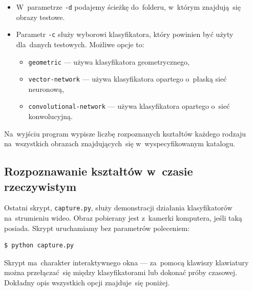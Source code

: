 \documentclass[11pt,a4paper]{article}
\begin{document}
\begin{itemize}
    \item W~parametrze \verb+-d+ podajemy ścieżkę do~folderu, w~którym znajdują~się obrazy testowe.
    \item Parametr \verb+-c+ służy wyborowi klasyfikatora, który powinien być użyty dla~danych testowych.
    Możliwe opcje to:
    \begin{itemize}
        \item \verb+geometric+ --- używa klasyfikatora geometrycznego,
        \item \verb+vector-network+ --- używa klasyfikatora opartego o~płaską sieć neuronową,
        \item \verb+convolutional-network+ --- używa klasyfikatora opartego o~sieć konwolucyjną.
    \end{itemize}
\end{itemize}

Na~wyjściu program wypisze liczbę rozpoznanych kształtów każdego rodzaju na~wszystkich obrazach znajdujących~się w~wyspecyfikowanym katalogu.

\subsection{Rozpoznawanie kształtów w~czasie rzeczywistym}

Ostatni skrypt, \verb+capture.py+, służy demonstracji działania klasyfikatorów na~strumieniu wideo.
Obraz pobierany jest z~kamerki komputera, jeśli taką posiada.
Skrypt uruchamiamy bez parametrów poleceniem:
\begin{verbatim}
$ python capture.py
\end{verbatim}
Skrypt ma~charakter interaktywnego okna --- za~pomocą klawiszy klawiatury można przełączać~się między klasyfikatorami lub dokonać próby czasowej.
Dokładny opis wszystkich opcji znajduje~się poniżej.
\end{document}
